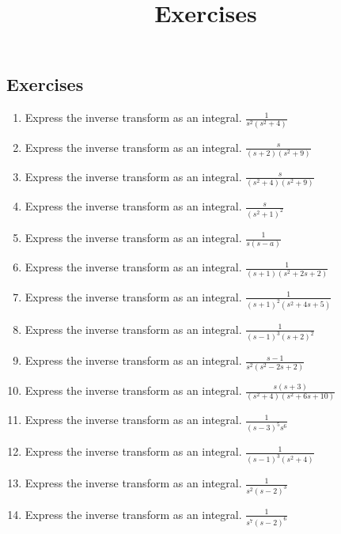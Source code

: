 \documentclass{ximera}
\title{Exercises} \license{CC BY-NC-SA 4.0}
\begin{document}
\begin{abstract}
\end{abstract}
\maketitle

\begin{onlineOnly}
\section*{Exercises}
\end{onlineOnly}

\begin{problem}\label{exer:8.6.1}

\begin{enumerate}

\item Express the inverse transform as an integral.  
$\frac{1}{s^2(s^2+4)}$

\item Express the inverse transform as an integral.
$\frac{s}{(s+2)(s^2+9)}$

\item Express the inverse transform as an integral.
$\frac{s}{(s^2+4)(s^2+9)}$

\item Express the inverse transform as an integral.
$\frac{s}{(s^2+1)^2}$

\item Express the inverse transform as an integral.
$\frac{1}{s(s-a)}$

\item Express the inverse transform as an integral.
$\frac{1}{(s+1)(s^2+2s+2)}$

\item Express the inverse transform as an integral.
$\frac{1}{(s+1)^2(s^2+4s+5)}$

\item Express the inverse transform as an integral.
$\frac{1}{(s-1)^3(s+2)^2}$

\item Express the inverse transform as an integral.
$\frac{s-1}{s^2(s^2-2s+2)}$

\item Express the inverse transform as an integral.
$\frac{s(s+3)}{(s^2+4)(s^2+6s+10)}$

\item Express the inverse transform as an integral.
$\frac{1}{(s-3)^5s^6}$

\item Express the inverse transform as an integral.
$\frac{1}{(s-1)^3(s^2+4)}$

\item Express the inverse transform as an integral.
$\frac{1}{s^2(s-2)^3}$

\item Express the inverse transform as an integral.
$\frac{1}{s^7(s-2)^6}$
\end{enumerate}
\end{problem}
\end{document}
